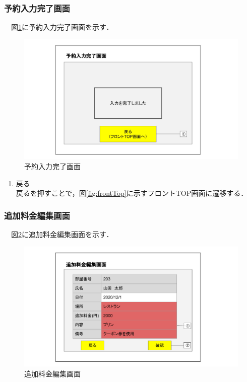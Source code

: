 \subsubsection{予約入力完了画面}
　図\ref{fig:frontRc}に予約入力完了画面を示す．

\begin{figure}[H]
 \centering
   \includegraphics[width=150mm]{UI_front/reseD.jpg}
 \caption{予約入力完了画面}
 \label{fig:frontRc}
\end{figure}


\begin{enumerate}
\renewcommand{\labelenumi}{\textcircled{\scriptsize \theenumi}}
\item 戻る\\ 戻るを押すことで，図\ref{fig:frontTop}に示すフロントTOP画面に遷移する．
\end{enumerate}


\subsubsection{追加料金編集画面}
　図\ref{fig:frontF}に追加料金編集画面を示す．

\begin{figure}[H]
 \centering
   \includegraphics[width=150mm]{UI_front/Additional-Fee-screen.pdf}
 \caption{追加料金編集画面}
 \label{fig:frontF}
\end{figure}


